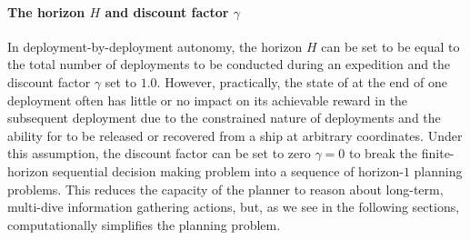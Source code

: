 
\paragraph{The horizon $H$ and discount factor $\gamma$} In deployment-by-deployment autonomy, the horizon $H$ can be set to be equal to the total number of deployments to be conducted during an expedition and the discount factor $\gamma$ set to $1.0$. However, practically, the state of \Sentry at the end of one deployment often has little or no impact on its achievable reward in the subsequent deployment due to the constrained nature of deployments and the ability for \Sentry to be released or recovered from a ship at arbitrary coordinates. Under this assumption, the discount factor can be set to zero $\gamma=0$ to break the finite-horizon sequential decision making problem into a sequence of horizon-$1$ planning problems. This reduces the capacity of the planner to reason about long-term, multi-dive information gathering actions, but, as we see in the following sections, computationally simplifies the planning problem.


